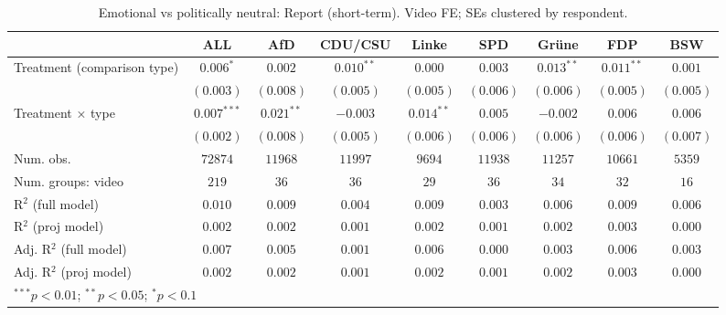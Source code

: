 
\begin{table}
\begin{center}
\begin{tabular}{l c c c c c c c c}
\hline
 & ALL & AfD & CDU/CSU & Linke & SPD & Grüne & FDP & BSW \\
\hline
Treatment (comparison type) & $0.006^{*}$   & $0.002$      & $0.010^{**}$ & $0.000$      & $0.003$   & $0.013^{**}$ & $0.011^{**}$ & $0.001$   \\
                            & $(0.003)$     & $(0.008)$    & $(0.005)$    & $(0.005)$    & $(0.006)$ & $(0.006)$    & $(0.005)$    & $(0.005)$ \\
Treatment × type            & $0.007^{***}$ & $0.021^{**}$ & $-0.003$     & $0.014^{**}$ & $0.005$   & $-0.002$     & $0.006$      & $0.006$   \\
                            & $(0.002)$     & $(0.008)$    & $(0.005)$    & $(0.006)$    & $(0.006)$ & $(0.006)$    & $(0.006)$    & $(0.007)$ \\
\hline
Num. obs.                   & $72874$       & $11968$      & $11997$      & $9694$       & $11938$   & $11257$      & $10661$      & $5359$    \\
Num. groups: video          & $219$         & $36$         & $36$         & $29$         & $36$      & $34$         & $32$         & $16$      \\
R$^2$ (full model)          & $0.010$       & $0.009$      & $0.004$      & $0.009$      & $0.003$   & $0.006$      & $0.009$      & $0.006$   \\
R$^2$ (proj model)          & $0.002$       & $0.002$      & $0.001$      & $0.002$      & $0.001$   & $0.002$      & $0.003$      & $0.000$   \\
Adj. R$^2$ (full model)     & $0.007$       & $0.005$      & $0.001$      & $0.006$      & $0.000$   & $0.003$      & $0.006$      & $0.003$   \\
Adj. R$^2$ (proj model)     & $0.002$       & $0.002$      & $0.001$      & $0.002$      & $0.001$   & $0.002$      & $0.003$      & $0.000$   \\
\hline
\multicolumn{9}{l}{\scriptsize{$^{***}p<0.01$; $^{**}p<0.05$; $^{*}p<0.1$}}
\end{tabular}
\caption{Emotional vs politically neutral: Report (short-term). Video FE; SEs clustered by respondent.}
\label{tab:compare_emotional_vs_neutral_report}
\end{center}
\end{table}
